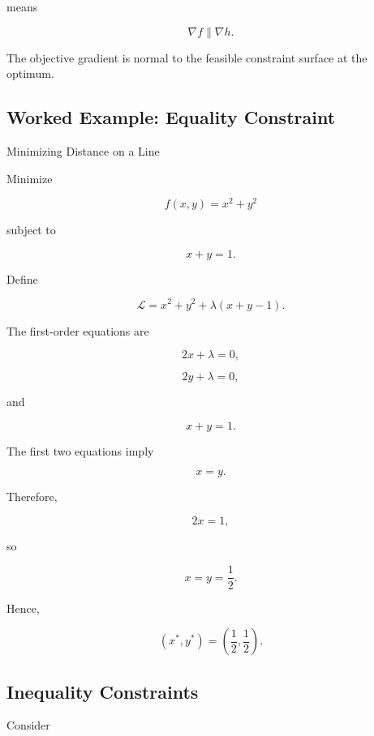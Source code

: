 means

\[
\boxed{
\nabla f
\parallel
\nabla h.
}
\]

The objective gradient is normal to the feasible constraint surface at
the optimum.

\subsection{Worked Example: Equality Constraint}
\label{subsec:worked-lagrange-multiplier}

\begin{workedexamplebox}{Minimizing Distance on a Line}

Minimize

\[
f(x,y)
=
x^2+y^2
\]

subject to

\[
x+y=1.
\]

Define

\[
\mathcal{L}
=
x^2+y^2
+
\lambda(x+y-1).
\]

The first-order equations are

\[
2x+\lambda=0,
\]

\[
2y+\lambda=0,
\]

and

\[
x+y=1.
\]

The first two equations imply

\[
x=y.
\]

Therefore,

\[
2x=1,
\]

so

\[
x=y=\frac12.
\]

Hence,

\begin{answerbox}
\[
\boxed{
(x^*,y^*)
=
\left(
\frac12,
\frac12
\right).
}
\]
\end{answerbox}

\end{workedexamplebox}

\subsection{Inequality Constraints}
\label{subsec:inequality-constraints-optimization}

Consider

